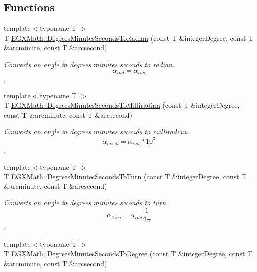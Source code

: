 \subsection*{Functions}
\begin{DoxyCompactItemize}
\item 
{\footnotesize template$<$typename T $>$ }\\T \mbox{\hyperlink{group___e_g_x_math-_conversions-_angle_conversions-_degrees_minutes_seconds_ga6c99d7a2a1646b3d9c8d40cd7f083aa4}{E\+G\+X\+Math\+::\+Degrees\+Minutes\+Seconds\+To\+Radian}} (const T \&integer\+Degree, const T \&arcminute, const T \&arcsecond)
\begin{DoxyCompactList}\small\item\em Converts an angle in degrees minutes seconds to radian. \[\alpha_{rad}=\alpha_{rad}\]. \end{DoxyCompactList}\item 
{\footnotesize template$<$typename T $>$ }\\T \mbox{\hyperlink{group___e_g_x_math-_conversions-_angle_conversions-_degrees_minutes_seconds_gacadb912be6af5dac1db702db86a69eeb}{E\+G\+X\+Math\+::\+Degrees\+Minutes\+Seconds\+To\+Milliradian}} (const T \&integer\+Degree, const T \&arcminute, const T \&arcsecond)
\begin{DoxyCompactList}\small\item\em Converts an angle in degrees minutes seconds to milliradian. \[\alpha_{mrad}=\alpha_{rad}*10^3\]. \end{DoxyCompactList}\item 
{\footnotesize template$<$typename T $>$ }\\T \mbox{\hyperlink{group___e_g_x_math-_conversions-_angle_conversions-_degrees_minutes_seconds_ga1e6b1b889f6914942b12623934341fc6}{E\+G\+X\+Math\+::\+Degrees\+Minutes\+Seconds\+To\+Turn}} (const T \&integer\+Degree, const T \&arcminute, const T \&arcsecond)
\begin{DoxyCompactList}\small\item\em Converts an angle in degrees minutes seconds to turn. \[\alpha_{turn}=\alpha_{rad}\frac{1}{2 \pi}\]. \end{DoxyCompactList}\item 
{\footnotesize template$<$typename T $>$ }\\T \mbox{\hyperlink{group___e_g_x_math-_conversions-_angle_conversions-_degrees_minutes_seconds_gae59bfb37c0751e60e315f8a1ed3dc0cf}{E\+G\+X\+Math\+::\+Degrees\+Minutes\+Seconds\+To\+Degree}} (const T \&integer\+Degree, const T \&arcminute, const T \&arcsecond)

\end{DoxyCompactItemize}
